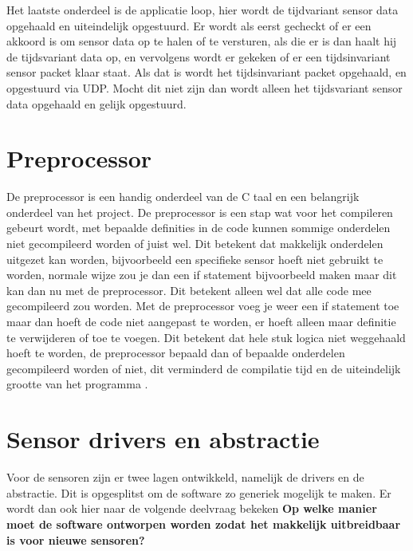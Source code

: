 \noindent Het laatste onderdeel is de applicatie loop, hier wordt de tijdvariant sensor data opgehaald en uiteindelijk opgestuurd. Er wordt als eerst gecheckt of er een akkoord is om sensor data op te halen of te versturen, als die er is dan haalt hij de tijdsvariant data op, en vervolgens wordt er gekeken of er een tijdsinvariant sensor packet klaar staat. Als dat is wordt het tijdsinvariant packet opgehaald, en opgestuurd via UDP. Mocht dit niet zijn dan wordt alleen het tijdsvariant sensor data opgehaald en gelijk opgestuurd. \newline

\section{Preprocessor} \label{sec:preprocessor}
De preprocessor is een handig onderdeel van de C taal en een belangrijk onderdeel van het project. De preprocessor is een stap wat voor het compileren gebeurt wordt, met bepaalde definities in de code kunnen sommige onderdelen niet gecompileerd worden of juist wel. Dit betekent dat makkelijk onderdelen uitgezet kan worden, bijvoorbeeld een specifieke sensor hoeft niet gebruikt te worden, normale wijze zou je dan een if statement bijvoorbeeld maken maar dit kan dan nu met de preprocessor. Dit betekent alleen wel dat alle code mee gecompileerd zou worden. Met de preprocessor voeg je weer een if statement toe maar dan hoeft de code niet aangepast te worden, er hoeft alleen maar definitie te verwijderen of toe te voegen. Dit betekent dat hele stuk logica niet weggehaald hoeft te worden, de preprocessor bepaald dan of bepaalde onderdelen gecompileerd worden of niet, dit verminderd de compilatie tijd en de uiteindelijk grootte van het programma \autocite{preprocessor}. 

\section{Sensor drivers en abstractie}
Voor de sensoren zijn er twee lagen ontwikkeld, namelijk de drivers en de abstractie. Dit is opgesplitst om de software zo generiek mogelijk te maken. Er wordt dan ook hier naar de volgende deelvraag bekeken \textbf{Op welke manier moet de software ontworpen worden zodat het makkelijk uitbreidbaar is voor nieuwe sensoren?} \newline 

